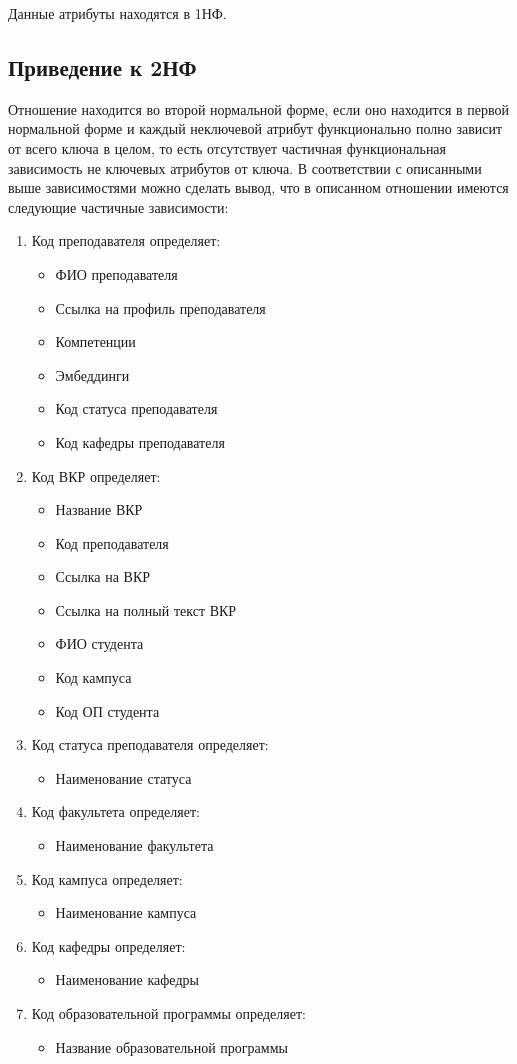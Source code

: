 \documentclass[PI,KR]{HSEUniversity}
\begin{document}
Данные атрибуты находятся в 1НФ.
\subsection{Приведение к 2НФ}
Отношение находится во второй нормальной форме, если оно находится в первой нормальной форме и каждый неключевой атрибут функционально полно зависит от всего ключа в целом, то есть отсутствует частичная функциональная зависимость не ключевых атрибутов от ключа.
В соответствии с описанными выше зависимостями можно сделать вывод, что в описанном отношении имеются следующие частичные зависимости:
\begin{enumerate}
	\item Код преподавателя определяет:
	\begin{itemize}
		\item ФИО преподавателя
		\item Ссылка на профиль преподавателя
		\item Компетенции
		\item Эмбеддинги
		\item Код статуса преподавателя
		\item Код кафедры преподавателя
	\end{itemize}
	\item Код ВКР определяет:
	\begin{itemize}
		\item Название ВКР
		\item Код преподавателя
		\item Ссылка на ВКР
		\item Ссылка на полный текст ВКР
		\item ФИО студента
		\item Код кампуса
		\item Код ОП студента
	\end{itemize}
	\item Код статуса преподавателя определяет:
	\begin{itemize}
		\item Наименование статуса
	\end{itemize}
	\item Код факультета определяет:
	\begin{itemize}
		\item Наименование факультета
	\end{itemize}
	\item Код кампуса определяет:
	\begin{itemize}
		\item Наименование кампуса
	\end{itemize}
	\item Код кафедры определяет:
	\begin{itemize}
		\item Наименование кафедры
	\end{itemize}
	\item Код образовательной программы определяет:
	\begin{itemize}
		\item Название образовательной программы
	\end{itemize}
\end{enumerate}
\end{document}
